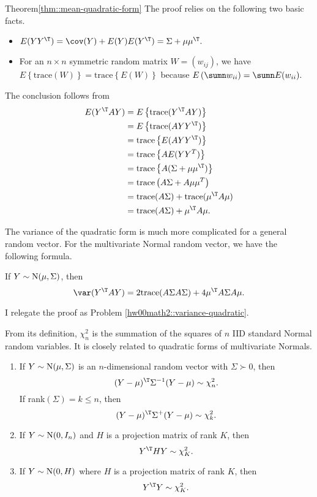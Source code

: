 \begin{myproof}{Theorem}{\ref{thm::mean-quadratic-form}}
The proof relies on the following two basic facts.
\begin{itemize}
\item $E(YY^{\T})=\cov(Y)+E(Y)E(Y^{\T})=\Sigma+\mu\mu^{\T}.$
\item For an $n\times n$ symmetric random matrix $W=(w_{ij})$, we have $E\left\{ \text{trace}(W)\right\} =\text{trace}\left\{ E(W)\right\} $ because $E\left(\sumn w_{ii}\right)=\sumn E(w_{ii}) .$
\end{itemize}

The conclusion follows from
\begin{align*}
E(Y^{\T}AY) & =E\left\{ \text{trace}(Y^{\T}AY)\right\} \\
 & =E\left\{ \text{trace}(AYY^{\T})\right\} \\
 & =\text{trace}\left\{ E(AYY^{\T})\right\} \\
 & =\text{trace}\left\{ AE(YY^{T})\right\} \\
 & =\text{trace}\left\{ A(\Sigma+\mu\mu^{\T})\right\} \\
 & =\text{trace}\left(A\Sigma+A\mu\mu^{T}\right)\\
 & =\text{trace}(A\Sigma)+\text{trace}(\mu^{\T}A\mu)\\
 & =\text{trace}(A\Sigma)+\mu^{\T}A\mu.
\end{align*}
\end{myproof}


The variance of the quadratic form is much more complicated for a general
random vector. For the multivariate Normal random vector, we have the
following formula.
\begin{theorem}
\label{thm:varianceofquadraticforms}If $Y\sim\textup{N}(\mu,\Sigma)$,
then
\[
\var(Y^{\T}AY)=2\textup{trace}(A\Sigma A\Sigma)+4\mu^{\T}A\Sigma A\mu.
\]
\end{theorem}

I relegate the proof as Problem \ref{hw00math2::variance-quadratic}. 


From its definition, $\chi_n^2$ is the summation of the squares of $n$ IID standard Normal random variables. It is closely related to
quadratic forms of multivariate Normals. 

\begin{theorem}\label{thm::normal-chisq}
\begin{enumerate}
\item If $Y\sim\textup{N}(\mu,\Sigma)$ is an $n$-dimensional random vector
with $\Sigma\succ 0$, then 
\[
(Y-\mu)^{\T}\Sigma^{-1}(Y-\mu)\sim\chi_{n}^{2}.
\]
If rank$(\Sigma) = k \leq n$, then 
$$
(Y-\mu)^{\T}\Sigma^{+}(Y-\mu)\sim\chi_{k}^{2}.
$$

\item If $Y\sim\textup{N}(0,I_{n})$ and $H$ is a projection matrix of rank
$K$, then 
\[
Y^{\T}HY\sim\chi_{K}^{2}.
\]
\item If $Y\sim\textup{N}(0,H)$ where $H$ is a projection matrix of rank
$K$, then
\[
Y^{\T}Y\sim\chi_{K}^{2}.
\]
\end{enumerate}
\end{theorem}

